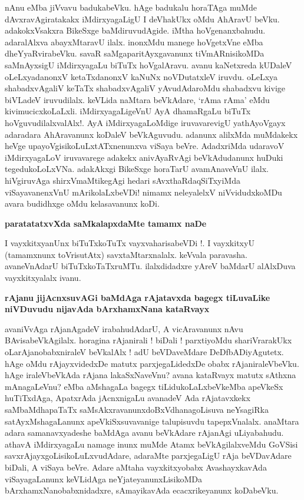 nAnu eMba jiVvavu badukabeVku. hAge badukalu horaTAga muMde dAvxravAgiratakakx iMdirxyagaLigU I deVhakUkx oMdu AhAravU beVku. adakokxVsakxra BikeSxge baMdiruvudAgide. iMtha hoVgenanxbahudu. adaralAlxva abayxMtaravU ilalx. inonxMdu manege hoVgetxVne eMba dheYyaRvirabeVku. savaR saMgaparitAyxgavanunx tiVmARnisikoMDa saMnAyxsigU iMdirxyagaLu biTuTx hoVgalAravu. avanu kaNetxreda kUDaleV oLeLxyadanonxV ketaTxdanonxV kaNuNx noVDutatxleV iruvdu. oLeLxya shabadxvAgaliV keTaTx shabadxvAgaliV yAvudAdaroMdu shabadxvu kivige biVLadeV iruvudilalx. keVLida naMtara beVkAdare, `rAma rAma' eMdu kivimucicxkoLaLxli. iMdirxyagaLigeVnU AyA dhamaRgaLu biTuTx hoVguvudilalxvalAlx!. AyA iMdirxyagaLoMdige iruvavarevigU yathAyoVgayx adaradara AhAravanunx koDaleV beVkAguvudu. adanunx alilxMda muMdakekx heVge upayoVgisikoLuLxtATxnenunxva viSaya beVre. AdadxriMda udaravoV iMdirxyagaLoV iruvavarege adakekx anivAyaRvAgi beVkAdudanunx huDuki tegedukoLoLxVNa. adakAkxgi BikeSxge horaTarU avamAnaveVnU ilalx. hiVgiruvAga shirxVmaMtikegAgi hedari sAvxthaRdaqSiTxyiMda viSayavanenxVnU mArikolaLxbeVDi! nimamx neleyalelxV niVvidudxkoMDu avara budidhxge oMdu kelasavanunx koDi.

\noindent
{\bf\large{paratatatxvXda saMkalapxdaMte tamamx naDe}}\label{page253}

I vayxkitxyanUnx biTuTxkoTuTx vayxvaharisabeVDi !. I vayxkitxyU (tamamxnunx toVrisutAtx) savxtaMtarxnalalx. keVvala paravasha. avaneVnAdarU biTuTxkoTaTxruMTu. ilalxdidadxre yAreV baMdarU alAlxDuva vayxkitxyalalx ivanu.

{\bf rAjanu jijAcnxsuvAGi baMdAga rAjatavxda bagegx tiLuvaLike niVDuvudu nijavAda bArxhamxNana kataRvayx}

avaniVvAga rAjanAgadeV irabahudAdarU, A vicAravanunx nAvu BAvisabeVkAgilalx. horagina rAjanirali ! biDali ! parxtiyoMdu shariVrarakUkx oLarAjanobabxniraleV beVkalAlx ! adU beVDaveMdare DeDfbADiyAgutetx. hAge oMdu rAjayxvidedxDe matutx parxjegaLidedxDe obabx rAjaniraleVbeVku. hAge iraleVbeVkAda rAjana lakaSxNaveVnu? avana kataRvayx matutx sAthxna mAnagaLeVnu? eMba aMshagaLa bagegx tiLidukoLaLxbeVkeMba apeVkeSx huTiTxdAga, ApatxrAda jAcnxnigaLu avanadeV Ada rAjatavxkekx saMbaMdhapaTaTx saMsAkxravanunxdoBxVdhanagoLisuva neYsagiRka satAyxMshagaLanunx apeVkiSxsuvavanige talupisuvdu tapepxVnalalx. anaMtara adara samanavxyadeshe baMdAga avanu beVkAdare rAjanAgi uLiyabahudu. athavA iMdirxyagaLu namage inunx muMde Atamx beVkAgilalxveMdu GoVSisi savxrAjayxgoLisikoLuLxvudAdare, adaraMte parxjegaLigU rAja beVDavAdare biDali, A viSaya beVre. Adare aMtaha vayxkitxyobabx AvashayxkavAda viSayagaLanunx keVLidAga neYjateyanunxLisikoMDa bArxhamxNanobabxnidadxre, sAmayikavAda ecacxrikeyanunx koDabeVku.

